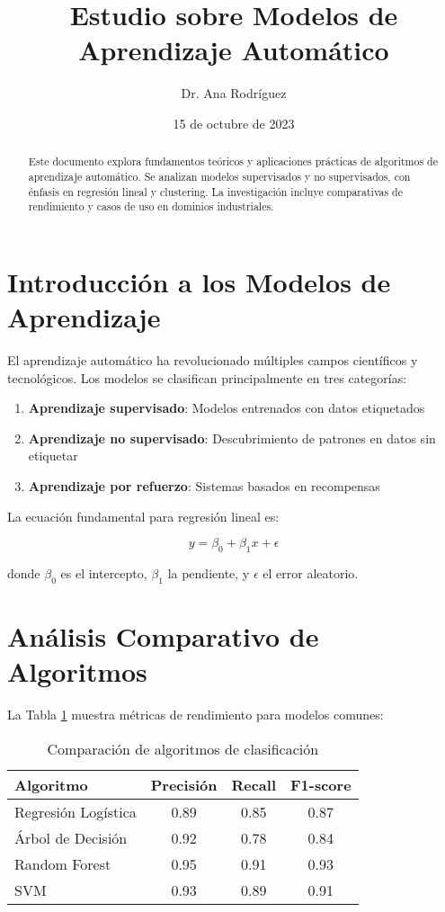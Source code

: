 \documentclass[12pt,a4paper]{article}
\title{Estudio sobre Modelos de Aprendizaje Automático}
\author{Dr. Ana Rodríguez}
\date{15 de octubre de 2023}
\begin{document}
\maketitle

\begin{abstract}
Este documento explora fundamentos teóricos y aplicaciones prácticas de algoritmos de aprendizaje automático. Se analizan modelos supervisados y no supervisados, con énfasis en regresión lineal y clustering. La investigación incluye comparativas de rendimiento y casos de uso en dominios industriales. \lipsum[1]
\end{abstract}

\section{Introducción a los Modelos de Aprendizaje}
\label{sec:intro}

El aprendizaje automático ha revolucionado múltiples campos científicos y tecnológicos. Los modelos se clasifican principalmente en tres categorías:

\begin{enumerate}[label=(\roman*)]
\item \textbf{Aprendizaje supervisado}: Modelos entrenados con datos etiquetados
\item \textbf{Aprendizaje no supervisado}: Descubrimiento de patrones en datos sin etiquetar
\item \textbf{Aprendizaje por refuerzo}: Sistemas basados en recompensas
\end{enumerate}

La ecuación fundamental para regresión lineal es:

\begin{equation}
\label{eq:regresion}
y = \beta_0 + \beta_1 x + \epsilon
\end{equation}

donde $\beta_0$ es el intercepto, $\beta_1$ la pendiente, y $\epsilon$ el error aleatorio. \lipsum[2-3]

\section{Análisis Comparativo de Algoritmos}
\label{sec:analisis}

La Tabla \ref{tab:comparativa} muestra métricas de rendimiento para modelos comunes:

\begin{table}[H]
\centering
\caption{Comparación de algoritmos de clasificación}
\label{tab:comparativa}
\begin{tabular}{@{}lccc@{}}
\toprule
\textbf{Algoritmo} & \textbf{Precisión} & \textbf{Recall} & \textbf{F1-score} \\
\midrule
Regresión Logística & 0.89 & 0.85 & 0.87 \\
Árbol de Decisión & 0.92 & 0.78 & 0.84 \\
Random Forest & 0.95 & 0.91 & 0.93 \\
SVM & 0.93 & 0.89 & 0.91 \\
\bottomrule
\end{tabular}
\end{table}
\end{document}
